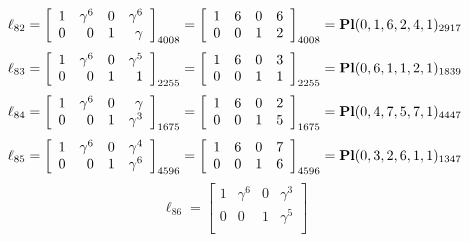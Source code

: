 \documentclass{article}
\begin{document}
{$$
\ell_{82} = 
\left[
\begin{array}{*{4}{r}}
1 & \gamma^{6} & 0 & \gamma^{6}\\
0 & 0 & 1 & \gamma \\
\end{array}
\right]
_{4008}
=
\left[
\begin{array}{*{4}c}
1  & 6  & 0  & 6\\
0  & 0  & 1  & 2\\
\end{array}
\right]_{4008}
={\rm\bf Pl}(0,1,6,2,4,1 )_{2917}$$
$$
\ell_{83} = 
\left[
\begin{array}{*{4}{r}}
1 & \gamma^{6} & 0 & \gamma^{5}\\
0 & 0 & 1 & 1\\
\end{array}
\right]
_{2255}
=
\left[
\begin{array}{*{4}c}
1  & 6  & 0  & 3\\
0  & 0  & 1  & 1\\
\end{array}
\right]_{2255}
={\rm\bf Pl}(0,6,1,1,2,1 )_{1839}$$
$$
\ell_{84} = 
\left[
\begin{array}{*{4}{r}}
1 & \gamma^{6} & 0 & \gamma \\
0 & 0 & 1 & \gamma^{3}\\
\end{array}
\right]
_{1675}
=
\left[
\begin{array}{*{4}c}
1  & 6  & 0  & 2\\
0  & 0  & 1  & 5\\
\end{array}
\right]_{1675}
={\rm\bf Pl}(0,4,7,5,7,1 )_{4447}$$
$$
\ell_{85} = 
\left[
\begin{array}{*{4}{r}}
1 & \gamma^{6} & 0 & \gamma^{4}\\
0 & 0 & 1 & \gamma^{6}\\
\end{array}
\right]
_{4596}
=
\left[
\begin{array}{*{4}c}
1  & 6  & 0  & 7\\
0  & 0  & 1  & 6\\
\end{array}
\right]_{4596}
={\rm\bf Pl}(0,3,2,6,1,1 )_{1347}$$
$$
\ell_{86} = 
\left[
\begin{array}{*{4}{r}}
1 & \gamma^{6} & 0 & \gamma^{3}\\
0 & 0 & 1 & \gamma^{5}\\
\end{array}
\right]
$$}
\end{document}
